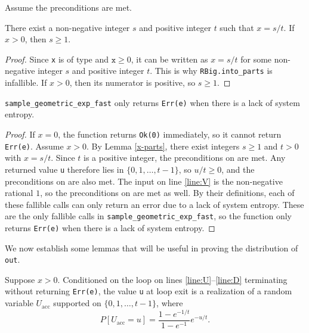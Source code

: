 \documentclass{article}
\begin{document}
Assume the preconditions are met.

\begin{lemma}\label{x-parts}
    There exist a non-negative integer $s$ and positive integer $t$ such that $x = s/t$.
    If $x > 0$, then $s \geq 1$.
\end{lemma}

\begin{proof}
    Since \texttt{x} is of type  and $\texttt{x} \geq 0$,
    it can be written as $x = s/t$ for some non-negative integer $s$ and positive integer $t$.
    This is why \texttt{RBig.into\_parts} is infallible.
    If $x > 0$, then its numerator is positive, so $s \geq 1$.
\end{proof}

\begin{lemma}\label{err-e}
    \texttt{sample\_geometric\_exp\_fast} only returns \texttt{Err(e)} when there is a lack of system entropy.
\end{lemma}

\begin{proof}
    If $x = 0$, the function returns \texttt{Ok(0)} immediately, so it cannot return \texttt{Err(e)}.
    Assume $x > 0$. By Lemma \ref{x-parts}, there exist integers $s \geq 1$ and $t > 0$ with $x = s/t$.
    Since $t$ is a positive integer, the preconditions on  are met.
    Any returned value \texttt{u} therefore lies in $\{0, 1, \dots, t - 1\}$, so $u/t \geq 0$,
    and the preconditions on  are also met.
    The input on line \ref{line:V} is the non-negative rational $1$, so the preconditions on
     are met as well.
    By their definitions, each of these fallible calls can only return an error due to a lack of system entropy.
    These are the only fallible calls in \texttt{sample\_geometric\_exp\_fast},
    so the function only returns \texttt{Err(e)} when there is a lack of system entropy.
\end{proof}

We now establish some lemmas that will be useful in proving the distribution of \texttt{out}.

\begin{lemma}\label{loop-dist}
    Suppose $x > 0$. Conditioned on the loop on lines \ref{line:U}--\ref{line:D} terminating without returning \texttt{Err(e)},
    the value \texttt{u} at loop exit is a realization of a random variable $U_{\mathrm{acc}}$ supported on $\{0, 1, \dots, t - 1\}$, where
    \[
        P[U_{\mathrm{acc}} = u] = \frac{1 - e^{-1/t}}{1 - e^{-1}} e^{-u/t}.
    \]
\end{lemma}
\end{document}
